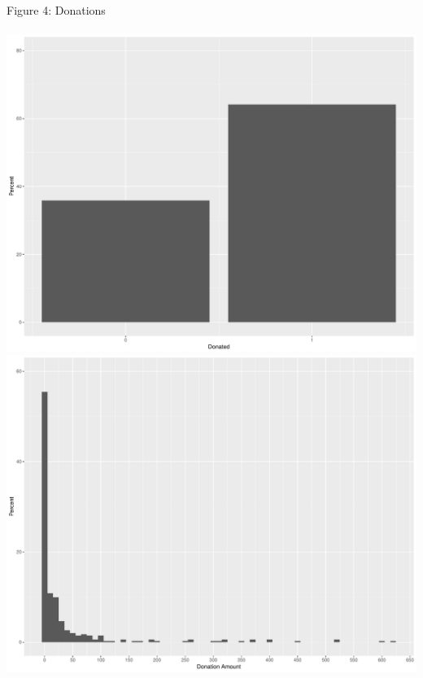 \documentclass{article}
\begin{document}
Figure 4: Donations\\ \\
\includegraphics[scale=0.35]{donated}\\
\includegraphics[scale=0.35]{donations}\\


	
\end{document}
